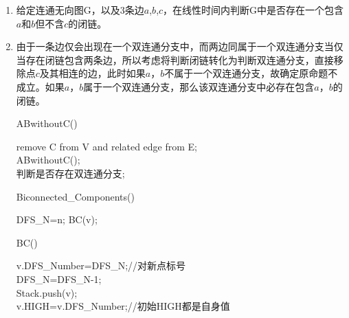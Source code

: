 \documentclass[12pt,a4paper]{article}
\makeatletter
\newtheorem*{solution}{Solution}
\theoremstyle{definition}
\renewenvironment{solution}[1][Solution] {\par\pushQED{\qed}\normalfont\topsep6\p@\@plus6\p@\relax\trivlist\item[\hskip\labelsep\bfseries#1\@addpunct{.}]\ignorespaces}{\popQED\endtrivlist\@endpefalse} \makeatother
\makeatother
\begin{document}
\begin{enumerate}
\item 给定连通无向图G，以及3条边$a$,$b$,$c$，在线性时间内判断G中是否存在一个包含$a$和$b$但不含$c$的闭链。
\begin{solution}
	由于一条边仅会出现在一个双连通分支中，而两边同属于一个双连通分支当仅当存在闭链包含两条边，所以考虑将判断闭链转化为判断双连通分支，直接移除点$c$及其相连的边，此时如果$a$，$b$不属于一个双连通分支，故确定原命题不成立。如果$a$，$b$属于一个双连通分支，那么该双连通分支中必存在包含$a$，$b$的闭链。
	\begin{center}
		\begin{algorithm}[H]
			\caption{ABwithoutC()}
			remove C from V and related edge from E;\\
			ABwithoutC();\\
			判断是否存在双连通分支;\\
		\end{algorithm}
	\end{center}
	\begin{center}
		\begin{algorithm}[H]
			\caption{Biconnected\_Components()}
			DFS\_N=n;
			BC(v);
		\end{algorithm}
	\end{center}
	\begin{center}
		\begin{algorithm}[H]
			\caption{BC()}
			v.DFS\_Number=DFS\_N;//对新点标号\\
			DFS\_N=DFS\_N-1;\\
			Stack.push(v);\\
			v.HIGH=v.DFS\_Number;//初始HIGH都是自身值
		\end{algorithm}
	\end{center}
	

\end{solution}
\end{enumerate}
\end{document}
